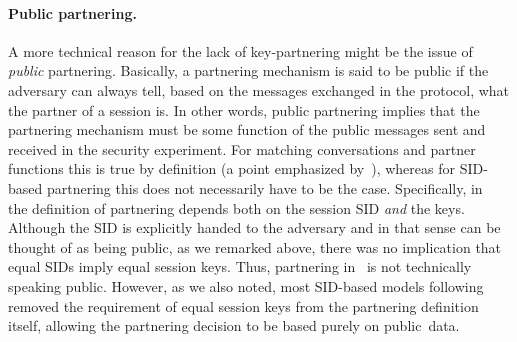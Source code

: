 \paragraph{Public partnering.}
A more technical reason for the lack of key-partnering might be the issue of \emph{public}  partnering.
Basically,
a partnering mechanism is said to be public if the adversary can always tell,
based on the messages exchanged in the protocol,
what the partner of a session is.
In other words,
public partnering implies that the partnering mechanism must be some function of the public messages sent and received in the security experiment.
For matching conversations and partner functions this is true by definition 
(a point emphasized by~\cite{STOC:BelRog95}),
whereas for SID-based partnering this does not necessarily have to be the case.
Specifically,
in~\cite{EC:BelPoiRog00} the definition of partnering depends both on the session SID \emph{and} the keys.
Although the SID is explicitly handed to the adversary and in that sense can be thought of as being public,
as we remarked above,
there was no implication that equal SIDs imply equal session keys.
Thus,
partnering in~\cite{EC:BelPoiRog00} is not technically speaking public.
However,
as we also noted,
most SID-based models following \cite{EC:BelPoiRog00} removed the requirement of equal session keys from the partnering definition itself,
allowing the partnering decision to be based purely on public~data.


